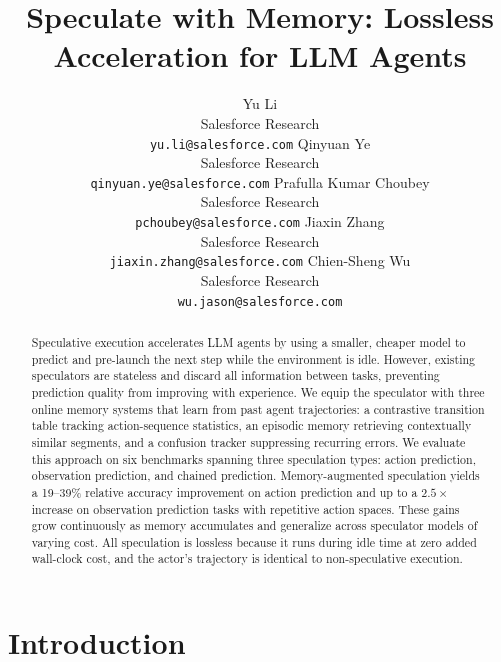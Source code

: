 \documentclass{article}
\title{Speculate with Memory: Lossless Acceleration for LLM Agents}
\author{
  Yu Li \\
  Salesforce Research \\
  \texttt{yu.li@salesforce.com}
  \And
  Qinyuan Ye \\
  Salesforce Research \\
  \texttt{qinyuan.ye@salesforce.com}
  \And
  Prafulla Kumar Choubey \\
  Salesforce Research \\
  \texttt{pchoubey@salesforce.com}
  \AND
  Jiaxin Zhang \\
  Salesforce Research \\
  \texttt{jiaxin.zhang@salesforce.com}
  \And
  Chien-Sheng Wu \\
  Salesforce Research \\
  \texttt{wu.jason@salesforce.com}
}
\begin{document}
\maketitle


\begin{abstract}
Speculative execution accelerates LLM agents by using a smaller, cheaper model to predict and pre-launch the next step while the environment is idle. However, existing speculators are stateless and discard all information between tasks, preventing prediction quality from improving with experience. We equip the speculator with three online memory systems that learn from past agent trajectories: a contrastive transition table tracking action-sequence statistics, an episodic memory retrieving contextually similar segments, and a confusion tracker suppressing recurring errors. We evaluate this approach on six benchmarks spanning three speculation types: action prediction, observation prediction, and chained prediction. Memory-augmented speculation yields a 19--39\% relative accuracy improvement on action prediction and up to a $2.5\times$ increase on observation prediction tasks with repetitive action spaces. These gains grow continuously as memory accumulates and generalize across speculator models of varying cost. All speculation is lossless because it runs during idle time at zero added wall-clock cost, and the actor's trajectory is identical to non-speculative execution.
\end{abstract}


\section{Introduction}
\label{sec:intro}
\end{document}
